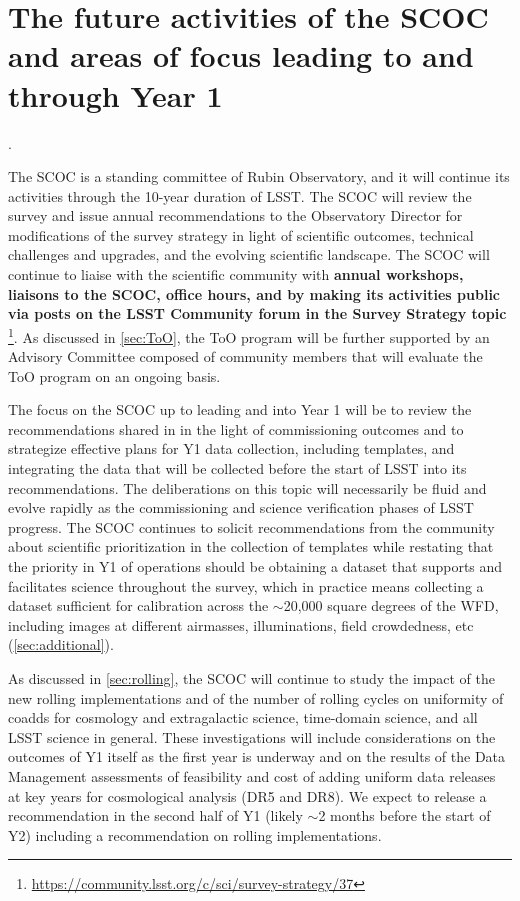 \section{The future activities of the SCOC and areas of focus leading to and through Year 1}\label{sec:next}.

The SCOC is a standing committee of Rubin Observatory, and it will continue its activities through the 10-year duration of LSST. The SCOC will review the survey and issue annual recommendations to the Observatory Director for modifications of the survey strategy in light of scientific outcomes, technical challenges and upgrades, and the evolving scientific landscape. The SCOC will continue to liaise with the scientific community with {\bf annual workshops, liaisons to the SCOC, office hours, and by making its activities public via posts on the LSST Community forum in the Survey Strategy topic}
\footnote{\url{https://community.lsst.org/c/sci/survey-strategy/37}}. As discussed in \autoref{sec:ToO}, the ToO program will be further supported by an Advisory Committee composed of community members that will evaluate the ToO program on an ongoing basis. 

The focus on the SCOC up to leading and into Year 1 will be to review the recommendations shared in  in the light of commissioning outcomes and to strategize effective plans for Y1 data collection, including templates, and integrating the data that will be collected before the start of LSST into its recommendations. The deliberations on this topic will necessarily be fluid and evolve rapidly as the commissioning and science verification phases of LSST progress. The SCOC continues to solicit recommendations from the community about scientific prioritization in the collection of templates while restating that the priority in Y1 of operations should be obtaining a dataset that supports and facilitates science throughout the survey, which in practice means collecting a dataset sufficient for calibration across the $\sim$20,000 square degrees of the WFD, including images at different airmasses, illuminations, field crowdedness, etc (\autoref{sec:additional}).

As discussed in \autoref{sec:rolling}, the SCOC will continue to study the impact of the new rolling implementations and of the number of rolling cycles on uniformity of coadds for cosmology and extragalactic science, time-domain science, and all LSST science in general. These investigations will include considerations on the outcomes of Y1 itself as the first year is underway and on the results of the Data Management assessments of feasibility and cost of adding uniform data releases at key years for cosmological analysis (DR5 and DR8). We expect to release a recommendation in the second half of Y1 (likely $\sim$2 months before the start of Y2) including a recommendation on rolling implementations.

